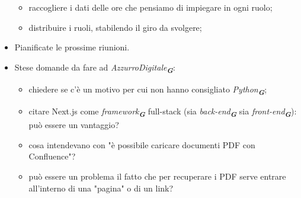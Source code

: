 \begin{itemize}
\begin{itemize}
        \item raccogliere i dati delle ore che pensiamo di impiegare in ogni ruolo;
        \item distribuire i ruoli, stabilendo il giro da svolgere;
    \end{itemize}
    \item Pianificate le prossime riunioni.
    \item Stese domande da fare ad \emph{AzzurroDigitale}\textsubscript{\textit{\textbf{G}}}:
    \begin{itemize}
        \item chiedere se c'è un motivo per cui non hanno consigliato \emph{Python}\textsubscript{\textit{\textbf{G}}};
        \item citare Next.js come \emph{framework}\textsubscript{\textit{\textbf{G}}} full-stack (sia \emph{back-end}\textsubscript{\textit{\textbf{G}}} sia \emph{front-end}\textsubscript{\textit{\textbf{G}}}): può essere un vantaggio?
        \item cosa intendevano con "è possibile caricare documenti PDF con Confluence"? 
        \item può essere un problema il fatto che per recuperare i PDF serve entrare all'interno di una "pagina" o di un link?
    \end{itemize}








\end{itemize}